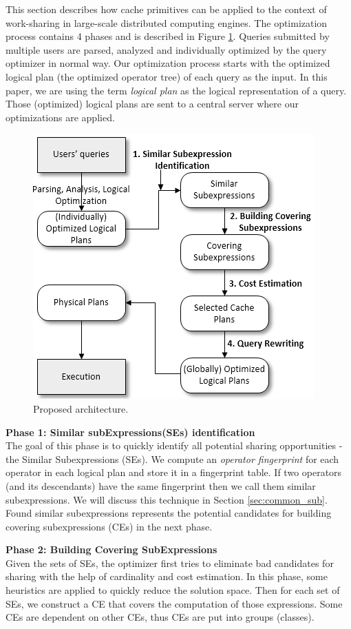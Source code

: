 This section describes how cache primitives can be applied to the context of work-sharing in large-scale distributed computing engines. The optimization process contains 4 phases and is described in Figure \ref{fig:phases_mqo}. Queries submitted by multiple users are parsed, analyzed and individually optimized by the query optimizer in normal way. Our optimization process starts with the optimized logical plan (the optimized operator tree) of each query as the input. In this paper, we are using the term \emph{logical plan} as the logical representation of a query. Those (optimized) logical plans are sent to a central server where our optimizations are applied.
\begin{figure}[!htb]
	\centering
 	\includegraphics[scale=0.7]{figures/phases_mqo}
   	\caption{Proposed architecture.} 
   	\label{fig:phases_mqo}
\end{figure}

\textbf{Phase 1: Similar subExpressions(SEs) identification}\\
The goal of this phase is to quickly identify all potential sharing opportunities - the Similar Subexpressions (SEs). We compute an \emph{operator fingerprint} for each operator in each logical plan and store it in a fingerprint table. If two operators (and its descendants) have the same fingerprint then we call them similar subexpressions. We will discuss this technique in Section \ref{sec:common_sub}. Found similar subexpressions represents the potential candidates for building covering subexpressions (CEs) in the next phase.

\textbf{Phase 2: Building Covering SubExpressions}\\
Given the sets of SEs, the optimizer first tries to eliminate bad candidates for sharing with the help of cardinality and cost estimation. In this phase, some heuristics are applied to quickly reduce the solution space. Then for each set of SEs, we construct a CE that covers the computation of those expressions. Some CEs are dependent on other CEs, thus CEs are put into groups (classes).


